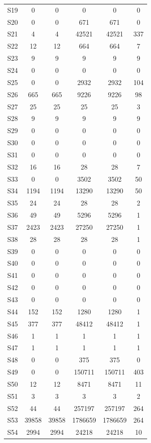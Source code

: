{\begin{longtable}{l S[table-format=9.0] S[table-format=9.0] S[table-format=9.0] S[table-format=9.0] S[table-format=9.0]}
S19 & 0 & 0 & 0 & 0 & 0 \\
S20 & 0 & 0 & 671 & 671 & 0 \\
S21 & 4 & 4 & 42521 & 42521 & 337 \\
S22 & 12 & 12 & 664 & 664 & 7 \\
S23 & 9 & 9 & 9 & 9 & 9 \\
S24 & 0 & 0 & 0 & 0 & 0 \\
S25 & 0 & 0 & 2932 & 2932 & 104 \\
S26 & 665 & 665 & 9226 & 9226 & 98 \\
S27 & 25 & 25 & 25 & 25 & 3 \\
S28 & 9 & 9 & 9 & 9 & 9 \\
S29 & 0 & 0 & 0 & 0 & 0 \\
S30 & 0 & 0 & 0 & 0 & 0 \\
S31 & 0 & 0 & 0 & 0 & 0 \\
S32 & 16 & 16 & 28 & 28 & 7 \\
S33 & 0 & 0 & 3502 & 3502 & 50 \\
S34 & 1194 & 1194 & 13290 & 13290 & 50 \\
S35 & 24 & 24 & 28 & 28 & 2 \\
S36 & 49 & 49 & 5296 & 5296 & 1 \\
S37 & 2423 & 2423 & 27250 & 27250 & 1 \\
S38 & 28 & 28 & 28 & 28 & 1 \\
S39 & 0 & 0 & 0 & 0 & 0 \\
S40 & 0 & 0 & 0 & 0 & 0 \\
S41 & 0 & 0 & 0 & 0 & 0 \\
S42 & 0 & 0 & 0 & 0 & 0 \\
S43 & 0 & 0 & 0 & 0 & 0 \\
S44 & 152 & 152 & 1280 & 1280 & 1 \\
S45 & 377 & 377 & 48412 & 48412 & 1 \\
S46 & 1 & 1 & 1 & 1 & 1 \\
S47 & 1 & 1 & 1 & 1 & 1 \\
S48 & 0 & 0 & 375 & 375 & 0 \\
S49 & 0 & 0 & 150711 & 150711 & 403 \\
S50 & 12 & 12 & 8471 & 8471 & 11 \\
S51 & 3 & 3 & 3 & 3 & 2 \\
S52 & 44 & 44 & 257197 & 257197 & 264 \\
S53 & 39858 & 39858 & 1786659 & 1786659 & 264 \\
S54 & 2994 & 2994 & 24218 & 24218 & 10 \\

\end{longtable}}
